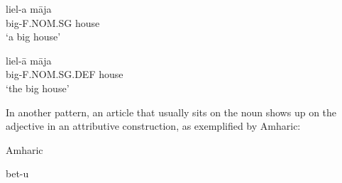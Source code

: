 

\item 


 \ea\label{}
\gll liel-a  m\=aja\\


big-F.NOM.SG  house\\

\glt ‘a big house’

\z

\item 


 \ea\label{}
\gll liel-\=a  m\=aja\\


big-F.NOM.SG.DEF  house\\

\glt ‘the big house’

\z

In another pattern, an article that usually sits on the noun shows up on the adjective in an attributive construction, as exemplified by Amharic:


\item 

Amharic 



\item 


 \ea\label{}
\gll bet-u\\



